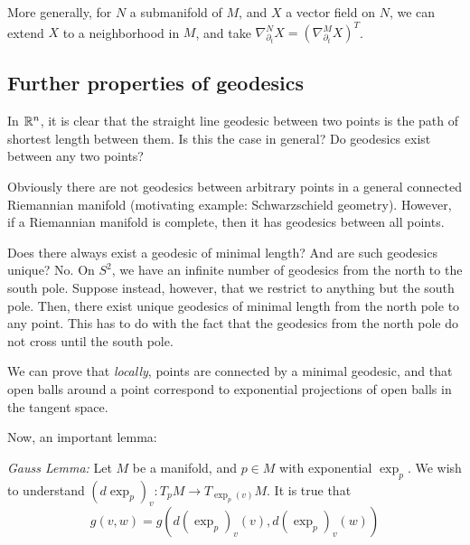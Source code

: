 \documentclass[../main.tex]{subfiles}
\begin{document}
More generally, for $N$ a submanifold of $M$, and $X$ a vector field on $N$, we
can extend $X$ to a neighborhood in $M$, and take $\nabla_{\partial_t}^NX =
(\nabla_{\partial_t}^MX)^T$.

\subsection{Further properties of geodesics}
In $\mathbb{R}^n$, it is clear that the straight line geodesic between two points is the path of
shortest length between them. Is this the case in general? Do geodesics exist
between any two points?

Obviously there are not geodesics between arbitrary points in a general
connected Riemannian manifold (motivating example: Schwarzschield geometry).
However, if a Riemannian manifold is complete, then it has geodesics between all
points.

Does there always exist a geodesic of minimal length? And are such geodesics
unique? No. On $S^2$, we have an infinite number of geodesics from the north to
the south pole. Suppose instead, however, that we restrict to anything but the
south pole. Then, there exist unique geodesics of minimal length from the north
pole to any point. This has to do with the fact that the geodesics from the
north pole do not cross until the south pole.

We can prove that {\em locally}, points are connected by a minimal geodesic, and
that open balls around a point correspond to exponential projections of open
balls in the tangent space.

Now, an important lemma:
\begin{lemma}
    {\em Gauss Lemma:} Let $M$ be a manifold, and $p\in M$ with exponential
    $\exp_p$. We wish to understand $(d\exp_p)_v:T_pM\to T_{\exp_p(v)}M$. It is
    true that
    \[
        g(v,w) = g(d(\exp_p)_v(v),d(\exp_p)_v(w))
    \]
\end{lemma}
\end{document}
